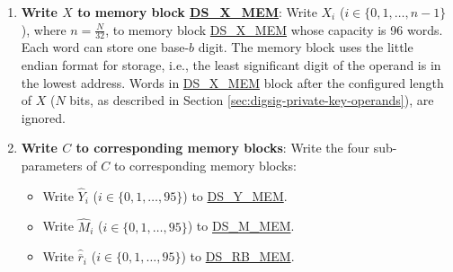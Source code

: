 \documentclass[main\_\_EN.tex]{subfiles}
\begin{document}
\begin{enumerate}
    \item {\bfseries Write \begin{math}X\end{math} to memory block \hyperref[DSXMEM]{DS\_X\_MEM}}: Write \begin{math}X_{i}\end{math}
        (\begin{math}i \in \{ 0, 1, \dots, n-1 \} \end{math}), where \begin{math} n = \frac{N}{32} \end{math}, to memory block \hyperref[DSXMEM]{DS\_X\_MEM} whose capacity is 96 words. Each word can store one base-\begin{math}b\end{math} digit. The memory block uses the little endian format for storage, i.e., the least significant digit of the operand is in the lowest address. Words in \hyperref[DSXMEM]{DS\_X\_MEM} block after the configured length of \begin{math}X\end{math} (\begin{math}N\end{math} bits, as described in Section \ref{sec:digsig-private-key-operands}), are ignored.

    \item {\bfseries Write \begin{math}C\end{math} to corresponding memory blocks}: Write the four sub-parameters of \begin{math}C\end{math} to corresponding memory blocks:
    \begin{itemize}
        \item Write \begin{math}\widehat{Y}_{i}\end{math}
        (\begin{math}i \in \{ 0, 1, \dots, 95 \} \end{math})
        to \hyperref[DSYMEM]{DS\_Y\_MEM}.

        \item Write \begin{math}\widehat{M}_{i}\end{math}
        (\begin{math}i \in \{ 0, 1, \dots, 95 \} \end{math})
        to \hyperref[DSMMEM]{DS\_M\_MEM}.

        \item Write \begin{math}\widehat{\overline{r}}_{i}\end{math}
        (\begin{math}i \in \{ 0, 1, \dots, 95 \} \end{math})
        to \hyperref[DSRBMEM]{DS\_RB\_MEM}.


\end{itemize}
\end{enumerate}
\end{document}
